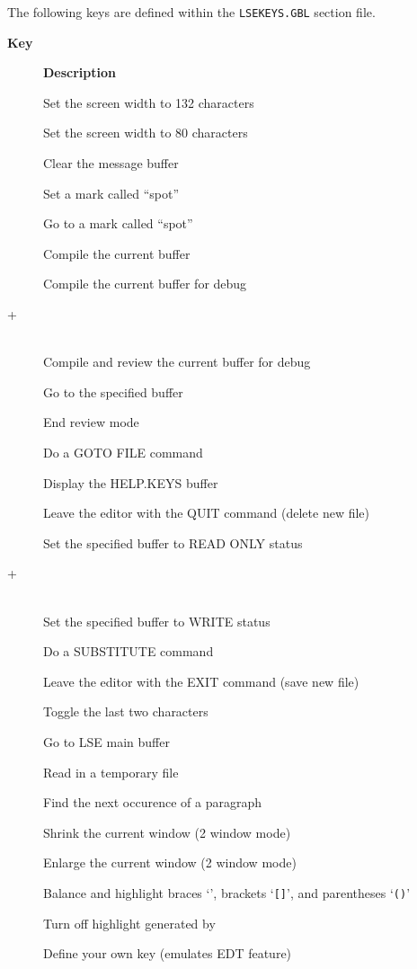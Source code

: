 The following keys are defined within the {\tt LSEKEYS.GBL}
section file. 
\def\descriptionlabel#1{\rm #1\ \hfil}
\renewcommand{\thefootnote}[0]{\fnsymbol{footnote}}
\begin{small}
\begin{description}
\item[\bf Key] {\bf Description}
\item[\gold {\tt [}] Set the screen width to 132 characters
\item[\gold {\tt ]}] Set the screen width to 80 characters
\item[\gold {\tt \bs}] Clear the message buffer
\item[] Set a mark called ``spot''
\item[\gold {\tt \tlde}] Go to a mark called ``spot''
\item[] Compile the current buffer
\item[]   Compile the current buffer for debug \footnotemark[1]
\item[\gold + ]  \mbox{} \\
Compile and review the current buffer for
debug\footnotemark[1]
\item[] Go to the specified buffer
\item[] End review mode
\item[] Do a GOTO FILE command
\item[] Display the HELP.KEYS buffer
\item[] Leave the editor with the QUIT command (delete new file)
\item[] Set the specified buffer to READ ONLY status
\item[\gold + ]  \mbox{} \\ Set the specified buffer to WRITE status
\item[] Do a SUBSTITUTE command
\item[] Leave the editor with the EXIT command (save new file)
\item[] Toggle the last two characters 
\item[] Go to LSE main buffer
\item[] Read in a temporary file
\item[] Find the next occurence of a paragraph
\item[\gold {\tt <}] Shrink the current window (2 window mode)
\item[\gold {\tt >}] Enlarge the current window (2 window mode)
\item[\gold {\tt \lb}] Balance and highlight braces `{\tt \lb \rb}', brackets
`{\tt []}', and parentheses `{\tt ()}'
\item[\gold {\tt \rb}] Turn off highlight generated by \gold {\tt \lb}
\item[] Define your own key (emulates EDT  feature)
\end{description}
\end{small}

